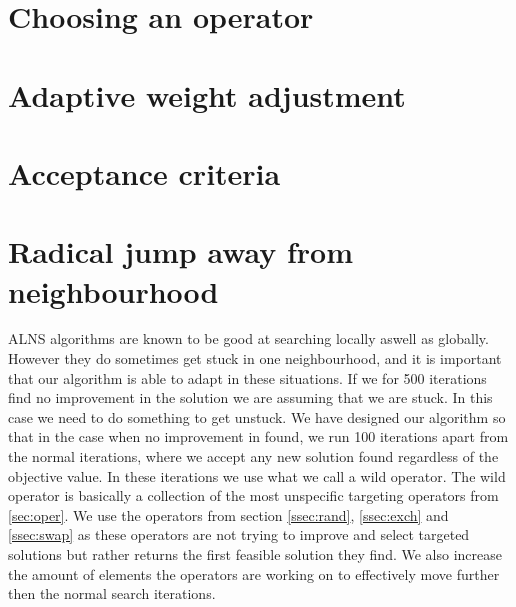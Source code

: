 \documentclass[../main.tex]{subfiles}
\begin{document}
\section{Choosing an operator}
\label{sec:opchice}

\section{Adaptive weight adjustment}
\label{sec:weight}

\section{Acceptance criteria}
\label{sec:accept}

\section{Radical jump away from neighbourhood}
\label{sec:wild}
ALNS algorithms are known to be good at searching locally aswell as globally. However they do sometimes get stuck in one neighbourhood, and it is important that our algorithm is able to adapt in these situations.
If we for 500 iterations find no improvement in the solution we are assuming that we are stuck. In this case we need to do something to get unstuck. 
We have designed our algorithm so that in the case when no improvement in found, we run 100 iterations apart from the normal iterations, where we accept any new solution found regardless of the objective value. 
In these iterations we use what we call a wild operator. 
The wild operator is basically a collection of the most unspecific targeting operators from \ref{sec:oper}.
We use the operators from section \ref{ssec:rand}, \ref{ssec:exch} and \ref{ssec:swap} as these operators are not trying to improve and select targeted solutions but rather returns the first feasible solution they find. 
We also increase the amount of elements the operators are working on to effectively move further then the normal search iterations. 





\biblio                                                         
\end{document}
